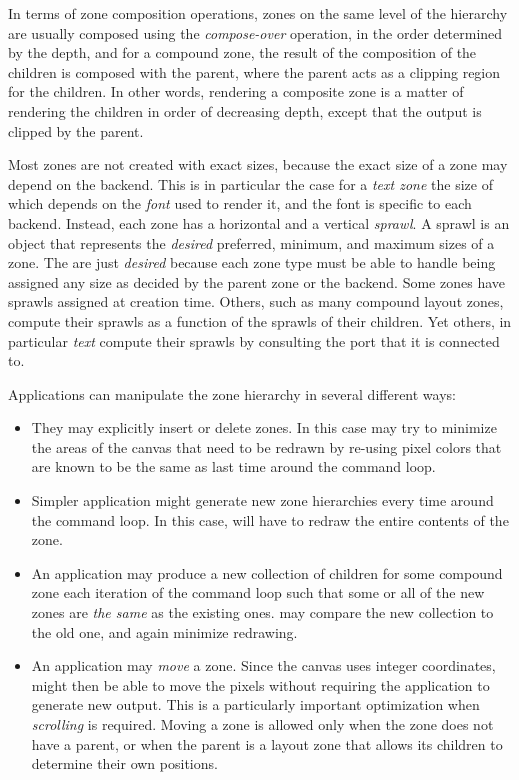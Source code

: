 In terms of zone composition operations, zones on the same level of
the hierarchy are usually composed using the \emph{compose-over}
operation, in the order determined by the depth, and for a compound
zone, the result of the composition of the children is composed with
the parent, where the parent acts as a clipping region for the
children.  In other words, rendering a composite zone is a matter of
rendering the children in order of decreasing depth, except that the
output is clipped by the parent. 

Most zones are not created with exact sizes, because the exact size of
a zone may depend on the backend.  This is in particular the case for
a \emph{text zone} the size of which depends on the \emph{font} used
to render it, and the font is specific to each backend.  Instead, each
zone has a horizontal and a vertical \emph{sprawl}.  A sprawl is an
object that represents the \emph{desired} preferred, minimum, and
maximum sizes of a zone.  The are just \emph{desired} because each
zone type must be able to handle being assigned any size as decided by
the parent zone or the backend.  Some zones have sprawls assigned at
creation time.  Others, such as many compound layout zones, compute
their sprawls as a function of the sprawls of their children.  Yet
others, in particular \emph{text} compute their sprawls by consulting
the port that it is connected to.

Applications can manipulate the zone hierarchy in several different
ways:  

\begin{itemize}
\item They may explicitly insert or delete zones.  In this case
  \clim{} may try to minimize the areas of the canvas that need to be
  redrawn by re-using pixel colors that are known to be the same as
  last time around the command loop.

\item Simpler application might generate new zone hierarchies every
  time around the command loop.  In this case, \clim{} will have to
  redraw the entire contents of the zone.

\item An application may produce a new collection of children for some
  compound zone each iteration of the command loop such that some or
  all of the new zones are \emph{the same} as the existing ones.
  \clim{} may compare the new collection to the old one, and again
  minimize redrawing.

\item An application may \emph{move} a zone.  Since the canvas uses
  integer coordinates, \clim{} might then be able to move the pixels
  without requiring the application to generate new output.  This is a
  particularly important optimization when \emph{scrolling} is
  required.  Moving a zone is allowed only when the zone does not have
  a parent, or when the parent is a layout zone that allows its
  children to determine their own positions. 
\end{itemize}

